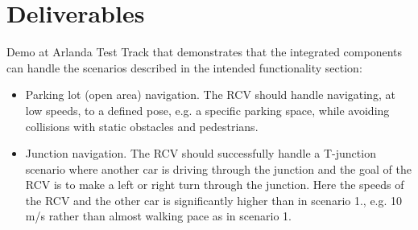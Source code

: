 \documentclass[11pt,a4paper]{article}
\begin{document}
\section{Deliverables}

Demo at Arlanda Test Track that demonstrates that the integrated
components can handle the scenarios described in the intended
functionality section:

\begin{itemize}
\item 
Parking lot (open area) navigation. The RCV should handle
navigating, at low speeds, to a defined pose, e.g. a
specific parking space, while avoiding collisions with static obstacles
and pedestrians.

\item 
Junction navigation. The RCV should successfully handle a T-junction
scenario where another car is driving through the junction and the
goal of the RCV is to make a left or right turn through the
junction. Here the speeds of the RCV and the other car is
significantly higher than in scenario 1., e.g. 10 m/s rather than
almost walking pace as in scenario 1.

\end{itemize}
\end{document}
